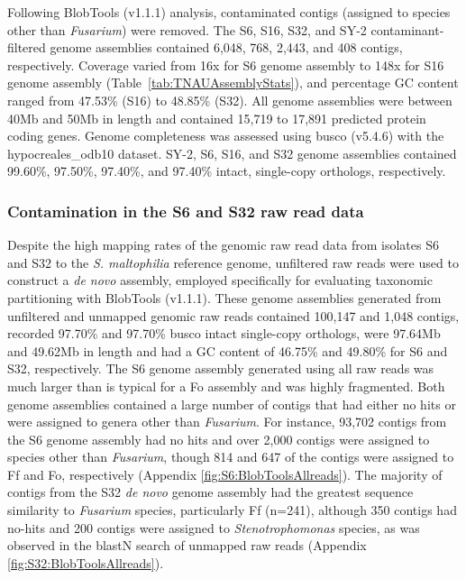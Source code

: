 Following BlobTools (v1.1.1) analysis, contaminated contigs (assigned to species other than \textit{Fusarium}) were removed. The  S6, S16, S32, and SY-2 contaminant-filtered genome assemblies contained 6,048, 768, 2,443, and 408 contigs, respectively. Coverage varied from 16x for S6 genome assembly to 148x for S16 genome assembly (Table~\ref{tab:TNAUAssemblyStats}), and percentage GC content ranged from 47.53\% (S16) to 48.85\% (S32). All genome assemblies were between 40Mb and 50Mb in length and contained 15,719 to 17,891 predicted protein coding genes. Genome completeness was assessed using \ac{busco} (v5.4.6) with the hypocreales\_odb10 dataset. SY-2, S6, S16, and S32 genome assemblies contained 99.60\%, 97.50\%, 97.40\%, and 97.40\% intact, single-copy orthologs, respectively. 



\subsubsection{Contamination in the S6 and S32 raw read data}
\label{sec:BlobToolsOfS6S32-allreads}

Despite the high mapping rates of the genomic raw read data from isolates S6 and S32 to the \textit{S. maltophilia} reference genome, unfiltered raw reads were used to construct a \textit{de novo} assembly, employed specifically for evaluating taxonomic partitioning with BlobTools (v1.1.1). These genome assemblies generated from unfiltered and unmapped genomic raw reads contained 100,147 and 1,048 contigs, recorded  97.70\% and 97.70\% \ac{busco} intact single-copy orthologs, were 97.64Mb and 49.62Mb in length and had a GC content of 46.75\% and 49.80\% for S6 and S32, respectively. The S6 genome assembly generated using all raw reads was much larger than is typical for a \ac{Fo} assembly and was highly fragmented. Both genome assemblies contained a large number of contigs that had either no hits or were assigned to genera other than \textit{Fusarium}.  For instance, 93,702 contigs from the S6 genome assembly had no hits and over 2,000 contigs were assigned to species other than \textit{Fusarium}, though 814 and 647 of the contigs were assigned to \ac{Ff} and \ac{Fo}, respectively (Appendix \ref{fig:S6:BlobToolsAllreads}). The majority of contigs from the S32 \textit{de novo} genome assembly had the greatest sequence similarity to \textit{Fusarium} species, particularly \ac{Ff} (n=241), although 350 contigs had no-hits and 200 contigs were assigned to \textit{Stenotrophomonas} species, as was observed in the \acs{blast}N search of unmapped raw reads (Appendix \ref{fig:S32:BlobToolsAllreads}). 

